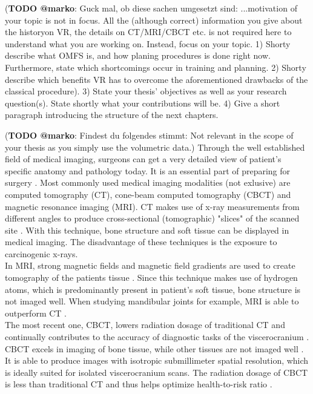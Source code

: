 (\textbf{TODO @marko}: Guck mal, ob diese sachen umgesetzt sind: ...motivation of your topic is not in focus. All the (although correct) 
information you give about the historyon VR, the details on CT/MRI/CBCT etc. is not required here to understand what you are working on.
Instead, focus on your topic.
1) Shorty describe what OMFS is, and how planing procedures is done right now.
Furthermore, state which shortcomings occur in training and planning.
2) Shorty describe which benefits VR has to overcome the aforementioned drawbacks of the classical procedure).
3) State your thesis' objectives as well as your research question(s).
State shortly what your contributions will be.
4) Give a short paragraph introducing the structure of the next chapters.

(\textbf{TODO @marko}: Findest du folgendes stimmt: Not relevant in the scope of your thesis as you simply use the volumetric data.)
Through the well established field of medical imaging, surgeons can get a very detailed view of patient’s specific anatomy and pathology today. 
It is an essential part of preparing for surgery \cite{Steinbacher.2015}.
Most commonly used medical imaging modalities (not exlusive) are computed tomography (CT), cone-beam computed tomography (CBCT) and magnetic resonance imaging (MRI).
CT makes use of x-ray measurements from different angles to produce cross-sectional (tomographic) "slices" of the scanned site \cite{Handels.2009}.
With this technique, bone structure and soft tissue can be displayed in medical imaging.
The disadvantage of these techniques is the exposure to carcinogenic x-rays.
\\
In MRI, strong magnetic fields and magnetic field gradients are used to create tomography of the patients tissue \cite{Handels.2009}.
Since this technique makes use of hydrogen atoms, which is predominantly present in patient's soft tissue, bone structure is not imaged well.
When studying mandibular joints for example, MRI is able to outperform CT \cite{RN65}.
\\
The most recent one, CBCT, lowers radiation dosage of traditional CT and continually contributes to the accuracy of diagnostic tasks of the viscerocranium \cite{Vos.2009}.
CBCT excels in imaging of bone tissue, while other tissues are not imaged well \cite{Vos.2009}.
It is able to produce images with isotropic submillimeter spatial resolution, which is ideally suited for isolated viscerocranium scans. 
The radiation dosage of CBCT is less than traditional CT and thus helps optimize health-to-risk ratio \cite{WHITE2008689}.

